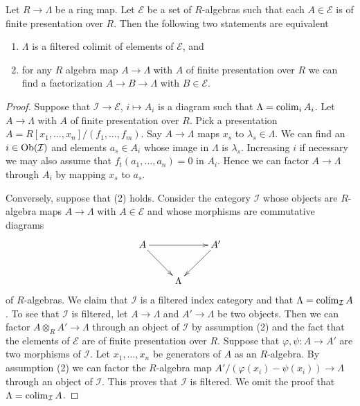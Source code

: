 \begin{lemma}
\label{lemma-when-colimit}
Let $R \to \Lambda$ be a ring map. Let $\mathcal{E}$ be a set of $R$-algebras
such that each $A \in \mathcal{E}$ is of finite presentation over $R$.
Then the following two statements are equivalent
\begin{enumerate}
\item $\Lambda$ is a filtered colimit of elements of $\mathcal{E}$, and
\item for any $R$ algebra map $A \to \Lambda$ with $A$ of finite
presentation over $R$ we can find a factorization $A \to B \to \Lambda$
with $B \in \mathcal{E}$.
\end{enumerate}
\end{lemma}

\begin{proof}
Suppose that $\mathcal{I} \to \mathcal{E}$, $i \mapsto A_i$
is a diagram such that $\Lambda = \mathop{\rm colim}\nolimits_i A_i$. Let $A \to \Lambda$
with $A$ of finite presentation over $R$. Pick a presentation
$A = R[x_1, \ldots, x_n]/(f_1, \ldots, f_m)$. Say $A \to \Lambda$
maps $x_s$ to $\lambda_s \in \Lambda$. We can find an $i \in \mathop{\rm Ob}\nolimits(\mathcal{I})$
and elements $a_s \in A_i$ whose image in $\Lambda$ is $\lambda_s$.
Increasing $i$ if necessary we may also assume that
$f_t(a_1, \ldots, a_n) = 0$ in $A_i$. Hence we can factor $A \to \Lambda$
through $A_i$ by mapping $x_s$ to $a_s$.

\medskip\noindent
Conversely, suppose that (2) holds. Consider the category $\mathcal{I}$
whose objects are $R$-algebra maps $A \to \Lambda$ with $A \in \mathcal{E}$
and whose morphisms are commutative diagrams
$$
\xymatrix{
A \ar[rr] \ar[rd] & & A' \ar[ld] \\
& \Lambda
}
$$
of $R$-algebras. We claim that $\mathcal{I}$ is a filtered index category
and that $\Lambda = \mathop{\rm colim}\nolimits_\mathcal{I} A$. To see that $\mathcal{I}$
is filtered, let $A \to \Lambda$ and $A' \to \Lambda$ be two objects.
Then we can factor $A \otimes_R A' \to \Lambda$ through an object
of $\mathcal{I}$ by assumption (2) and the fact that the elements
of $\mathcal{E}$ are of finite presentation over $R$. Suppose that
$\varphi, \psi : A \to A'$ are two morphisms of $\mathcal{I}$.
Let $x_1, \ldots, x_n$ be generators of $A$ as an $R$-algebra.
By assumption (2)  we can factor the $R$-algebra map
$A'/(\varphi(x_i) - \psi(x_i)) \to \Lambda$ through an object of
$\mathcal{I}$. This proves that $\mathcal{I}$ is filtered.
We omit the proof that $\Lambda = \mathop{\rm colim}\nolimits_\mathcal{I} A$.
\end{proof}


